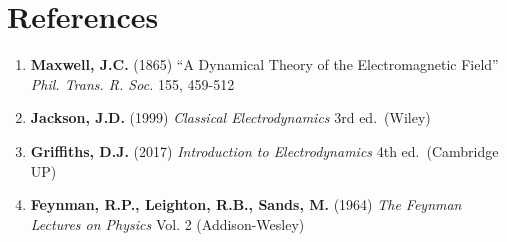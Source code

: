 \section{References}

\begin{enumerate}
\def\labelenumi{\arabic{enumi}.}
\tightlist
\item
  \textbf{Maxwell, J.C.} (1865) ``A Dynamical Theory of the
  Electromagnetic Field'' \emph{Phil. Trans. R. Soc.} 155, 459-512
\item
  \textbf{Jackson, J.D.} (1999) \emph{Classical Electrodynamics} 3rd
  ed.~(Wiley)
\item
  \textbf{Griffiths, D.J.} (2017) \emph{Introduction to Electrodynamics}
  4th ed.~(Cambridge UP)
\item
  \textbf{Feynman, R.P., Leighton, R.B., Sands, M.} (1964) \emph{The
  Feynman Lectures on Physics} Vol. 2 (Addison-Wesley)
\end{enumerate}
